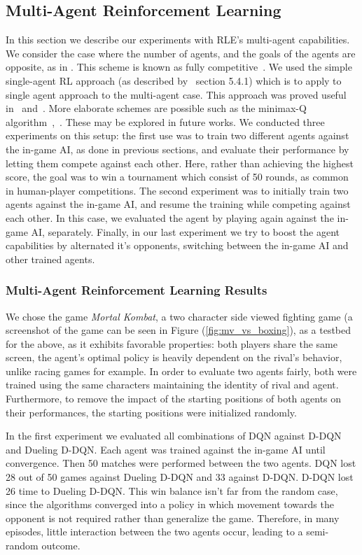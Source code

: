 \documentclass{article}
\begin{document}
\subsection{Multi-Agent Reinforcement Learning}
In this section we describe our experiments with RLE's multi-agent capabilities.
We consider the case where the number of agents,  and the goals of the agents are opposite, as in . This scheme is known as fully competitive~\citep{bucsoniu2010multi}. We used the simple single-agent RL approach (as described by~\citet{bucsoniu2010multi} section 5.4.1) which is to apply to single agent approach to the multi-agent case. This approach was proved useful in~\citet{crites1996improving} and~\citet{mataric1997reinforcement}. More elaborate schemes are possible such as the minimax-Q algorithm~\citep{littman1994markov},~\citep{littman2001value}. These may be explored in future works.
We conducted three experiments on this setup: the first use was to train two different agents against the in-game AI, as done in previous sections, and evaluate their performance by letting them compete against each other. 
Here, rather than achieving the highest score, the goal was to win a tournament which consist of 50 rounds, as common in human-player competitions.
The second experiment was to initially train two agents against the in-game AI, and resume the training while competing against each other.
In this case, we evaluated the agent by playing again against the in-game AI, separately.
Finally, in our last experiment we try to boost the agent capabilities by alternated it's opponents, switching between the in-game AI and other trained agents.


\subsubsection{Multi-Agent Reinforcement Learning Results}
We chose the game \textit{Mortal Kombat}, a two character side viewed fighting game (a screenshot of the game can be seen in Figure (\ref{fig:mv_vs_boxing}),  as a testbed for the above, as it exhibits favorable properties: both players share the same screen, the agent's optimal policy is heavily dependent on the rival's behavior, unlike racing games for example.
In order to evaluate two agents fairly, both were trained using the same characters maintaining the identity of rival and agent. Furthermore, to remove the impact of the starting positions of both agents on their performances, the starting positions were initialized randomly.

In the first experiment we evaluated all combinations of DQN against D-DQN and Dueling D-DQN. 
Each agent was trained against the in-game AI until convergence. Then 50 matches were performed between the two agents. DQN lost 28 out of 50 games against Dueling D-DQN and 33 against D-DQN. 
D-DQN lost 26 time to Dueling D-DQN. 
This win balance isn't far from the random case, since the algorithms converged into a policy in which movement towards the opponent is not required rather than generalize the game. 
Therefore, in many episodes, little interaction between the two agents occur, leading to a semi-random outcome.
\end{document}
